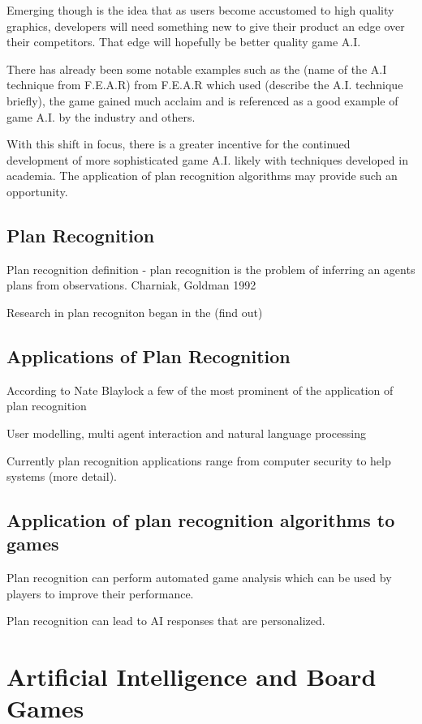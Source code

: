 \documentclass[parskip]{cs4rep}
\begin{document}
Emerging though is the idea that as users become accustomed to high quality graphics, developers will need something new to give their product an edge over their competitors. That edge will hopefully be better quality game A.I.

There has already been some notable examples such as the (name of the A.I technique from F.E.A.R) from F.E.A.R which used (describe the A.I. technique briefly), the game gained much acclaim and is referenced as a good example of game A.I. by the industry and others.

With this shift in focus, there is a greater incentive for the continued development of more sophisticated game A.I. likely with techniques developed in academia. The application of plan recognition algorithms may provide such an opportunity. 

\subsection{Plan Recognition}

Plan recognition definition - plan recognition is the problem of inferring an agents plans from observations. Charniak, Goldman 1992

Research in plan recogniton began in the (find out)

\subsection{Applications of Plan Recognition}

According to Nate Blaylock a few of the most prominent of the application of plan recognition 

User modelling, multi agent interaction and natural language processing

Currently plan recognition applications range from computer security to help systems (more detail).

\subsection{Application of plan recognition algorithms to games}

Plan recognition can perform automated game analysis which can be used by players to improve their performance. 

Plan recognition can lead to AI responses that are personalized.

\section{Artificial Intelligence and Board Games}
\end{document}
